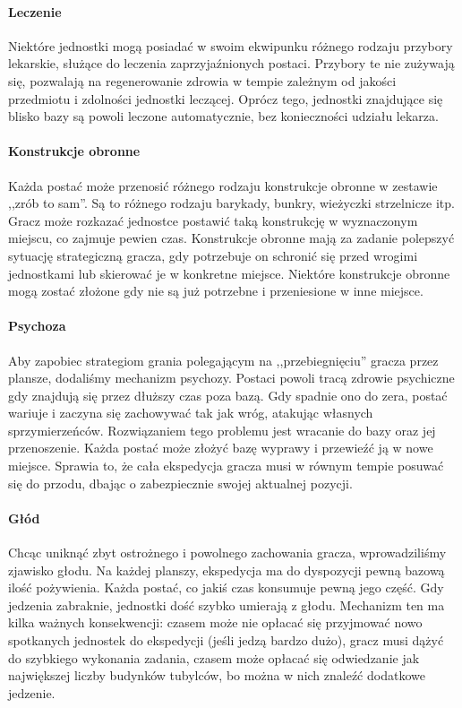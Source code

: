\documentclass[licencjacka]{pracamgr}
\begin{document}
    \paragraph{Leczenie}
      Niektóre jednostki mogą posiadać w swoim ekwipunku różnego rodzaju przybory lekarskie, służące do leczenia zaprzyjaźnionych postaci.
      Przybory te nie zużywają się, pozwalają na regenerowanie zdrowia w tempie zależnym od jakości przedmiotu i zdolności jednostki leczącej. 
      Oprócz tego, jednostki znajdujące się blisko bazy są powoli leczone automatycznie, bez konieczności udziału lekarza. 
    \paragraph{Konstrukcje obronne}
      Każda postać może przenosić różnego rodzaju konstrukcje obronne w zestawie ,,zrób to sam''. Są to różnego rodzaju barykady, bunkry, wieżyczki
      strzelnicze itp. Gracz może rozkazać jednostce postawić taką konstrukcję w wyznaczonym miejscu, co zajmuje pewien czas. 
      Konstrukcje obronne mają za zadanie polepszyć sytuację strategiczną gracza, gdy potrzebuje on schronić się przed wrogimi jednostkami lub
      skierować je w konkretne miejsce. Niektóre konstrukcje obronne mogą zostać złożone gdy nie są już potrzebne i przeniesione w inne miejsce.
    \paragraph{Psychoza}
      Aby zapobiec strategiom grania polegającym na ,,przebiegnięciu'' gracza przez plansze, dodaliśmy mechanizm psychozy. Postaci 
      powoli tracą zdrowie psychiczne gdy znajdują się przez dłuższy czas poza bazą. Gdy spadnie ono do zera, postać wariuje i 
      zaczyna się zachowywać tak jak wróg, atakując własnych sprzymierzeńców. Rozwiązaniem tego problemu jest wracanie do bazy oraz jej przenoszenie. 
      Każda postać może złożyć bazę wyprawy i przewieźć ją w nowe miejsce. Sprawia to, że cała ekspedycja gracza musi w równym tempie posuwać się
      do przodu, dbając o zabezpiecznie swojej aktualnej pozycji.
    \paragraph{Głód}
      Chcąc uniknąć zbyt ostrożnego i powolnego zachowania gracza, wprowadziliśmy zjawisko głodu. Na każdej planszy, ekspedycja ma do dyspozycji pewną
      bazową ilość pożywienia. Każda postać, co jakiś czas konsumuje pewną jego część. Gdy jedzenia zabraknie, jednostki dość szybko 
      umierają z głodu. Mechanizm ten ma kilka ważnych konsekwencji: czasem może nie opłacać się przyjmować nowo spotkanych jednostek do ekspedycji
      (jeśli jedzą bardzo dużo), gracz musi dążyć do szybkiego wykonania zadania, czasem może opłacać się odwiedzanie jak największej liczby budynków 
      tubylców, bo można w nich znaleźć dodatkowe jedzenie. 
\end{document}
